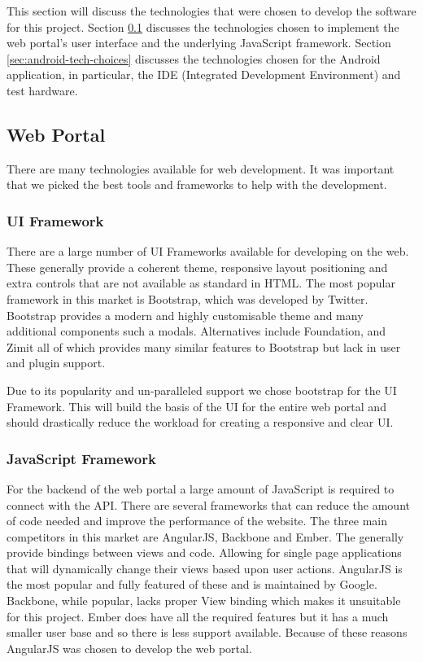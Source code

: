 \documentclass[11pt,a4paper]{article}
\begin{document}
This section will discuss the technologies that were chosen to develop the software for this project. Section \ref{sec:web-portal-tech-choices} discusses the technologies chosen to implement the web portal's user interface and the underlying JavaScript framework. Section \ref{sec:android-tech-choices} discusses the technologies chosen for the Android application, in particular, the IDE (Integrated Development Environment) and test hardware.

\subsection{Web Portal}
\label{sec:web-portal-tech-choices}
There are many technologies available for web development. It was important that we picked the best tools and frameworks to help with the development.

\subsubsection{UI Framework}
\label{sec:ui-framework}
There are a large number of UI Frameworks available for developing on the web. These generally provide a coherent theme, responsive layout positioning and extra controls that are not available as standard in HTML. The most popular framework in this market is Bootstrap\cite{bootstrap}, which was developed by Twitter. Bootstrap provides a modern and highly customisable theme and many additional components such a modals. Alternatives include Foundation\cite{foundation}, and Zimit\cite{zimit} all of which provides many similar features to Bootstrap but lack in user and plugin support.

Due to its popularity and un-paralleled support we chose bootstrap for the UI Framework. This will build the basis of the UI for the entire web portal and should drastically reduce the workload for creating a responsive and clear UI.

\subsubsection{JavaScript Framework}
For the backend of the web portal a large amount of JavaScript is required to connect with the API. There are several frameworks that can reduce the amount of code needed and improve the performance of the website. The three main competitors in this market are AngularJS\cite{angular}, Backbone\cite{backbone} and Ember\cite{ember}. The generally provide bindings between views and code. Allowing for single page applications that will dynamically change their views based upon user actions. AngularJS is the most popular and fully featured of these and is maintained by Google. Backbone, while popular, lacks proper View binding which makes it unsuitable for this project. Ember does have all the required features but it has a much smaller user base and so there is less support available. Because of these reasons AngularJS was chosen to develop the web portal.
\end{document}
